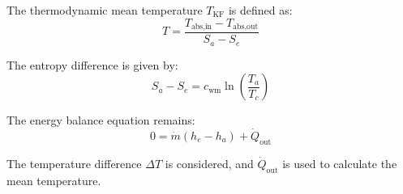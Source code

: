 The thermodynamic mean temperature \( T_{\text{KF}} \) is defined as:  
\[
T = \frac{T_{\text{abs,in}} - T_{\text{abs,out}}}{S_a - S_e}
\]  

The entropy difference is given by:  
\[
S_a - S_e = c_{\text{wm}} \ln \left( \frac{T_a}{T_c} \right)
\]  

The energy balance equation remains:  
\[
0 = \dot{m} (h_e - h_a) + \dot{Q}_{\text{out}}
\]  

The temperature difference \( \Delta T \) is considered, and \( \dot{Q}_{\text{out}} \) is used to calculate the mean temperature.